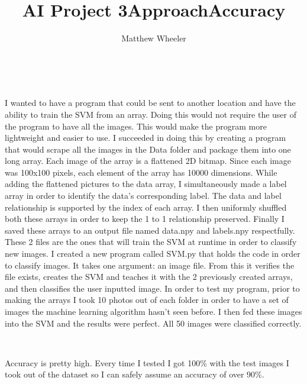 \documentclass[]{report}
\title{AI Project 3}
\author{Matthew Wheeler}
\begin{document}
\maketitle
\title{Approach}\\\par
I wanted to have a program that could be sent to another location and have the ability to train the SVM from an array. Doing this would not require the user of the program to have all the images. This would make the program more lightweight and easier to use. I succeeded in doing this by creating a program that would scrape all the images in the Data folder and package them into one long array. Each image of the array is a flattened 2D bitmap. Since each image was 100x100 pixels, each element of the array has 10000 dimensions. While adding the flattened pictures to the data array, I simultaneously made a label array in order to identify the data's corresponding label. The data and label relationship is supported by the index of each array. I then uniformly shuffled both these arrays in order to keep the 1 to 1 relationship preserved. Finally I saved these arrays to an output file named data.npy and labels.npy respectfully. These 2 files are the ones that will train the SVM at runtime in order to classify new images. I created a new program called SVM.py that holds the code in order to classify images. It takes one argument: an image file. From this it verifies the file exists, creates the SVM and teaches it with the 2 previously created arrays, and then classifies the user inputted image. In order to test my program, prior to making the arrays I took 10 photos out of each folder in order to have a set of images the machine learning algorithm hasn't seen before. I then fed these images into the SVM and the results were perfect. All 50 images were classified correctly.\\\par
\title{Accuracy}\\\par
Accuracy is pretty high. Every time I tested I got 100\% with the test images I took out of the dataset so I can safely assume an accuracy of over 90\%.
\end{document}
